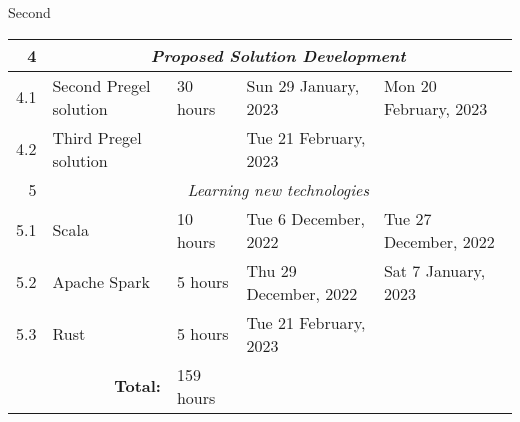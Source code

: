 Second\documentclass{standalone}
\begin{document}
\begin{tabular}{|r|llll|}
    4                                                             & \multicolumn{4}{c|}{\textit{Proposed Solution Development}}                                                                                                                                                                                                   \\ \hline
    4.1                                                           & \multicolumn{1}{l|}{Second Pregel solution}                     & \multicolumn{1}{l|}{30 hours}                                  & \multicolumn{1}{l|}{Sun 29 January, 2023}                   & Mon 20 February, 2023                                        \\ \hline
    4.2                                                           & \multicolumn{1}{l|}{Third Pregel solution}                      & \multicolumn{1}{l|}{}                                          & \multicolumn{1}{l|}{Tue 21 February, 2023}                  &                                                              \\ \hline
    5                                                             & \multicolumn{4}{c|}{\textit{Learning new technologies}}                                                                                                                                                                                                       \\ \hline
    5.1                                                           & \multicolumn{1}{l|}{Scala}                                      & \multicolumn{1}{l|}{10 hours}                                  & \multicolumn{1}{l|}{Tue 6 December, 2022}                   & Tue 27 December, 2022                                        \\ \hline
    5.2                                                           & \multicolumn{1}{l|}{Apache Spark}                               & \multicolumn{1}{l|}{5 hours}                                   & \multicolumn{1}{l|}{Thu 29 December, 2022}                  & Sat 7 January, 2023                                          \\ \hline
    5.3                                                           & \multicolumn{1}{l|}{Rust}                                       & \multicolumn{1}{l|}{5 hours}                                   & \multicolumn{1}{l|}{Tue 21 February, 2023}                  &                                                              \\ \hline
    \multicolumn{2}{|r|}{\cellcolor[HTML]{C0C0C0}\textbf{Total:}} & \multicolumn{1}{l|}{159 hours}                                                                                                                                                                                                                                \\ \cline{1-3}
\end{tabular}
\end{document}
